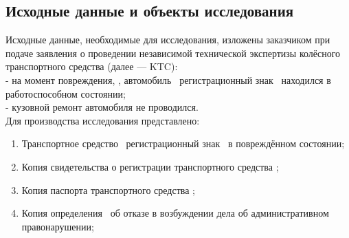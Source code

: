 \setcounter{page}{1}





\def\итог{50243}
\def\итогизнос{106500}
\def\рынок{2400000}


\subsection{Исходные данные и объекты исследования} 
Исходные  данные,  необходимые  для   исследования,  изложены   заказчиком при подаче заявления о проведении  независимой технической экспертизы   колёсного  транспортного  средства (далее —  KTC):\\
- на момент повреждения, , автомобиль \, регистрационный знак \, находился в работоспособном состоянии;\\
- кузовной ремонт автомобиля не проводился.\\
  
Для производства исследования представлено:
\begin{enumerate}
\item Транспортное средство \, регистрационный знак   \, в повреждённом состоянии;
\item Копия свидетельства о регистрации транспортного средства ;
\item Копия паспорта транспортного средства ;
\item Копия определения    \, об отказе в возбуждении дела об административном правонарушении;
	\end{enumerate}
%
%

